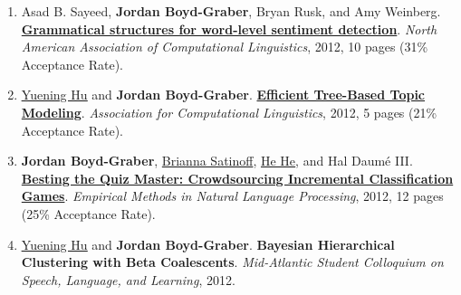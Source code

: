 \documentclass[10pt,a4paper]{article} %
\begin{document}
{\begin{enumerate}
	 \item Asad B. Sayeed, {\bf Jordan Boyd-Graber}, Bryan Rusk, and Amy Weinberg.  {\bf \href{http://cs.colorado.edu/~jbg//docs/srt_naacl_2012.pdf}{Grammatical structures for word-level sentiment detection}}.  \emph{North American Association of Computational Linguistics}, 2012, 10 pages (31\% Acceptance Rate).

	 \item \underline{\href{http://www.cs.umd.edu/~ynhu/}{Yuening Hu}} and {\bf Jordan Boyd-Graber}.  {\bf \href{http://cs.colorado.edu/~jbg//docs/acl_2012_fttm.pdf}{Efficient Tree-Based Topic Modeling}}.  \emph{Association for Computational Linguistics}, 2012, 5 pages (21\% Acceptance Rate).

	 \item {\bf Jordan Boyd-Graber}, \underline{Brianna Satinoff}, \underline{\href{http://www.umiacs.umd.edu/~hhe/}{He He}}, and Hal {Daum\'{e} III}.  {\bf \href{http://cs.colorado.edu/~jbg//docs/qb_emnlp_2012.pdf}{Besting the Quiz Master: Crowdsourcing Incremental Classification Games}}.  \emph{Empirical Methods in Natural Language Processing}, 2012, 12 pages (25\% Acceptance Rate).

	 \item \underline{\href{http://www.cs.umd.edu/~ynhu/}{Yuening Hu}} and {\bf Jordan Boyd-Graber}.  {\bf Bayesian Hierarchical Clustering with Beta Coalescents}.  \emph{Mid-Atlantic Student Colloquium on Speech, Language, and Learning}, 2012.


\end{enumerate}
}
\end{document}
